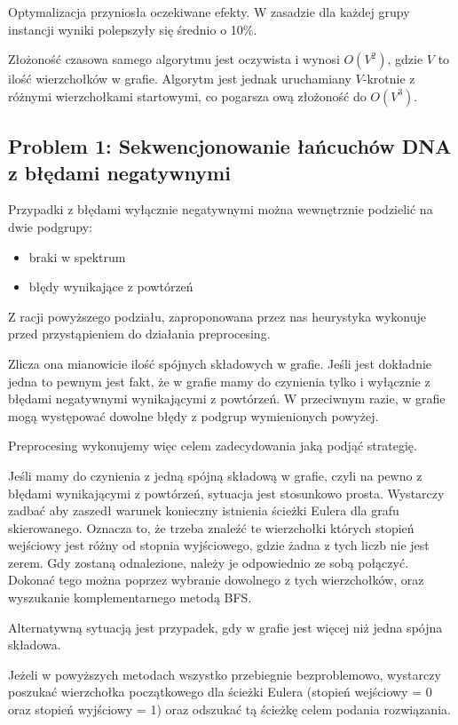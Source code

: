 \documentclass[a4paper]{article}
\begin{document}
Optymalizacja przyniosła oczekiwane efekty. W zasadzie dla każdej grupy instancji wyniki polepszyły się średnio o 10\%.

Złożoność czasowa samego algorytmu jest oczywista i wynosi $O(V^2)$, gdzie $V$ to ilość wierzchołków w grafie. Algorytm jest
jednak uruchamiany $V$-krotnie z różnymi wierzchołkami startowymi, co pogarsza ową złożoność do $O(V^3)$.


\subsection{Problem 1: Sekwencjonowanie łańcuchów DNA z błędami negatywnymi}
Przypadki z błędami wyłącznie negatywnymi można wewnętrznie podzielić na dwie podgrupy:
\begin{itemize}
\item braki w spektrum
\item błędy wynikające z powtórzeń
\end{itemize}
Z racji powyższego podziału, zaproponowana przez nas heurystyka wykonuje przed przystąpieniem do działania preprocesing.

Zlicza ona mianowicie ilość spójnych składowych w grafie. Jeśli jest dokładnie jedna to pewnym jest fakt, że w grafie
mamy do czynienia tylko i wyłącznie z błędami negatywnymi wynikającymi z powtórzeń. W przeciwnym razie, w grafie
mogą występować dowolne błędy z podgrup wymienionych powyżej.

Preprocesing wykonujemy więc celem zadecydowania jaką podjąć strategię.

Jeśli mamy do czynienia z jedną spójną składową w grafie, czyli na pewno z błędami wynikającymi z powtórzeń, sytuacja jest
stosunkowo prosta. Wystarczy zadbać aby zaszedł warunek konieczny istnienia ścieżki Eulera dla grafu skierowanego. 
Oznacza to, że trzeba znaleźć te wierzchołki których stopień wejściowy jest różny od stopnia wyjściowego, gdzie żadna
z tych liczb nie jest zerem. Gdy zostaną odnalezione, należy je odpowiednio ze sobą połączyć. Dokonać tego można poprzez
wybranie dowolnego z tych wierzchołków, oraz wyszukanie komplementarnego metodą BFS.

Alternatywną sytuacją jest przypadek, gdy w grafie jest więcej niż jedna spójna składowa. %

Jeżeli w powyższych metodach wszystko przebiegnie bezproblemowo, wystarczy poszukać wierzchołka początkowego dla ścieżki
Eulera (stopień wejściowy = 0 oraz stopień wyjściowy = 1) oraz odszukać tą ścieżkę celem podania rozwiązania.
\end{document}
